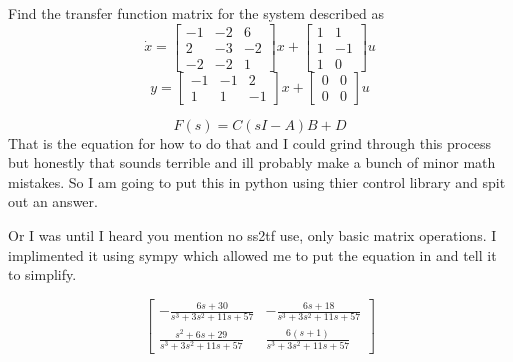 
\item Find the transfer function matrix for the system described as
  \begin{equation}
\dot x = \begin{bmatrix}
-1 & -2 & 6\\
2 & -3 & -2\\
-2 & -2 & 1
\end{bmatrix}
x + \begin{bmatrix}
1 & 1\\
1 & -1\\
1 & 0
\end{bmatrix}
u\end{equation}
\begin{equation}
y = \begin{bmatrix}
-1 & -1 & 2\\
1 & 1 & -1
\end{bmatrix}
x + \begin{bmatrix}
0 & 0\\
0 & 0
\end{bmatrix}
u\end{equation}

  
  \begin{equation}
    F(s) = C(sI-A)B + D
  \end{equation}
  That is the equation for how to do that and I could grind through this process but honestly that sounds
  terrible and ill probably make a bunch of minor math mistakes. So I am going to put this in python using thier
  control library and spit out an answer.

  Or I was until I heard you mention no ss2tf use, only basic matrix operations. I implimented it using
  sympy which allowed me to put the equation in and tell it to simplify. 

  \begin{equation}
\left[\begin{matrix}- \frac{6 s + 30}{s^{3} + 3 s^{2} + 11 s + 57} & - \frac{6 s + 18}{s^{3} + 3 s^{2} + 11 s + 57}\\\frac{s^{2} + 6 s + 29}{s^{3} + 3 s^{2} + 11 s + 57} & \frac{6 \left(s + 1\right)}{s^{3} + 3 s^{2} + 11 s + 57}\end{matrix}\right]\end{equation}

  
